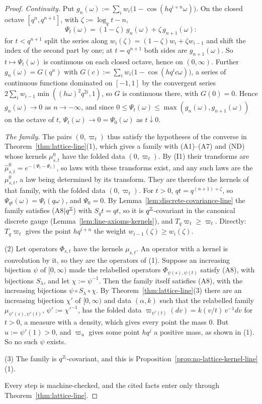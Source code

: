 \begin{proof}
\emph{Continuity.} Put $g_n(\omega) := \sum_iw_i\bigl(1 - \cos(hq^{i+n}\omega)\bigr)$. On the closed
octave $[q^n, q^{n+1}]$, with $\zeta := \log_qt - n$,
\[
  \Psi_t(\omega) = (1 - \zeta)\,g_n(\omega) + \zeta\,g_{n+1}(\omega) :
\]
for $t < q^{n+1}$ split the series along $w_i(\zeta) = (1-\zeta)w_i + \zeta w_{i-1}$ and shift the index
of the second part by one; at $t = q^{n+1}$ both sides are $g_{n+1}(\omega)$. So
$t \mapsto \Psi_t(\omega)$ is continuous on each closed octave, hence on $(0,\infty)$. Further
$g_n(\omega) = G(q^n)$ with $G(c) := \sum_iw_i\bigl(1 - \cos(hq^ic\omega)\bigr)$, a series of
continuous functions dominated on $[-1,1]$ by the convergent series
$2\sum_iw_{i-1}\min((h\omega)^2q^{2i}, 1)$, so $G$ is continuous there, with $G(0) = 0$. Hence
$g_n(\omega) \to 0$ as $n \to -\infty$, and since $0 \le \Psi_t(\omega) \le \max(g_n(\omega),
g_{n+1}(\omega))$ on the octave of $t$, $\Psi_t(\omega) \to 0 = \Psi_0(\omega)$ as $t \downarrow 0$.

\emph{The family.} The pairs $(0, \varpi_t)$ thus satisfy the hypotheses of the converse in
Theorem~\ref{thm:lattice-line}(1), which gives a family with (A1)--(A7) and (ND) whose kernels
$\mu^0_{s,t}$ have the folded data $(0, \varpi_t)$. By (I1) their transforms are
$\widehat\mu^0_{s,t} = e^{-(\Psi_t - \Psi_s)}$, so laws with these transforms exist, and any such laws
are the $\mu^0_{s,t}$, a law being determined by its transform. They are therefore the kernels of
that family, with the folded data $(0, \varpi_t)$. For $t > 0$, $qt = q^{(n+1)+\zeta}$, so
$\Psi_{qt}(\omega) = \Psi_t(q\omega)$, and $\Psi_0 = 0$. By Lemma~\ref{lem:discrete-covariance-line}
the family satisfies (A8$|q^{\mathbb{Z}}$) with $S_qt = qt$, so it is $q^{\mathbb{Z}}$-covariant in the canonical
discrete gauge (Lemma~\ref{lem:line-axioms-kernels}), and $T_q\varpi_t \ge \varpi_t$. Directly:
$T_q\varpi_t$ gives the point $hq^{i+n}$ the weight $w_{i-1}(\zeta) \ge w_i(\zeta)$.

(2) Let operators $\Phi_{s,t}$ have the kernels $\mu_{s,t}$. An operator with a kernel is
convolution by it, so they are the operators of (1). Suppose an increasing bijection $\psi$ of
$[0,\infty)$ made the relabelled operators $\Phi_{\psi(s),\psi(t)}$ satisfy (A8), with bijections
$S_\lambda$, and let $\chi := \psi^{-1}$. Then the family itself satisfies (A8), with the increasing
bijections $\psi \circ S_\lambda \circ \chi$. By Theorem~\ref{thm:lattice-line}(3) there are an
increasing bijection $\chi'$ of $[0,\infty)$ and data $(\alpha, k)$ such that the relabelled family
$\mu_{\psi'(s),\psi'(t)}$, $\psi' := \chi'^{-1}$, has the folded data $\varpi_{\psi'(t)}(dv) =
k(v/t)\,v^{-1}dv$ for $t > 0$, a measure with a density, which gives every point the mass $0$. But
$u := \psi'(1) > 0$, and $\varpi_u$ gives some point $hq^j$ a positive mass, as shown in (1). So no
such $\psi$ exists.

(3) The family is $q^{\mathbb{Z}}$-covariant, and this is
Proposition~\ref{prop:no-lattice-kernel-line}(1).

Every step is machine-checked, and the cited facts enter only through
Theorem~\ref{thm:lattice-line}.
\end{proof}

